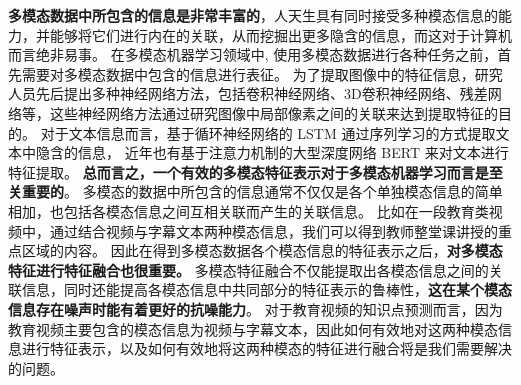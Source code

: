     \textbf{多模态数据中所包含的信息是非常丰富的}，人天生具有同时接受多种模态信息的能力，并能够将它们进行内在的关联，从而挖掘出更多隐含的信息，而这对于计算机而言绝非易事。
    在多模态机器学习领域中, 使用多模态数据进行各种任务之前，首先需要对多模态数据中包含的信息进行表征。
    为了提取图像中的特征信息，研究人员先后提出多种神经网络方法，包括卷积神经网络\cite{Krizhevsky2012ImageNetCW}、3D卷积神经网络\cite{Tran2015LearningSF}、残差网络\cite{He2016DeepRL}等，这些神经网络方法通过研究图像中局部像素之间的关联来达到提取特征的目的。
    对于文本信息而言，基于循环神经网络的 LSTM\cite{Hochreiter1997LongSM} 通过序列学习的方式提取文本中隐含的信息，
    近年也有基于注意力机制的大型深度网络 BERT\cite{Devlin2019BERTPO} 来对文本进行特征提取。
    \textbf{总而言之，一个有效的多模态特征表示对于多模态机器学习而言是至关重要的}\cite{Baltruaitis2019MultimodalML}。
    多模态的数据中所包含的信息通常不仅仅是各个单独模态信息的简单相加，也包括各模态信息之间互相关联而产生的关联信息。
    比如在一段教育类视频中，通过结合视频与字幕文本两种模态信息，我们可以得到教师整堂课讲授的重点区域的内容。 
    因此在得到多模态数据各个模态信息的特征表示之后，\textbf{对多模态特征进行特征融合也很重要。}
    多模态特征融合不仅能提取出各模态信息之间的关联信息，同时还能提高各模态信息中共同部分的特征表示的鲁棒性\cite{Baltruaitis2019MultimodalML}，\textbf{这在某个模态信息存在噪声时能有着更好的抗噪能力}。
    对于教育视频的知识点预测而言，因为教育视频主要包含的模态信息为视频与字幕文本，因此如何有效地对这两种模态信息进行特征表示，以及如何有效地将这两种模态的特征进行融合将是我们需要解决的问题。

